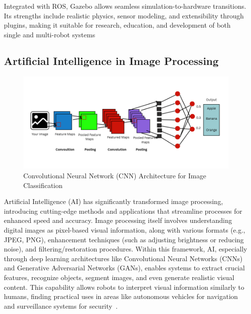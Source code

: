 \documentclass[12pt]{extarticle}
\begin{document}
Integrated with ROS, Gazebo allows seamless simulation-to-hardware transitions. Its strengths include realistic physics, sensor modeling, and extensibility through plugins, making it suitable for research, education, and development of both single and multi-robot systems~\cite{gazebo}


\subsection{Artificial Intelligence in Image Processing}

\begin{figure}[htbp]
    \centering
    \includegraphics[width=0.8\linewidth]{images/CNN.png}
    \caption{Convolutional Neural Network (CNN) Architecture for Image Classification}
    \label{fig:cnn}
\end{figure}

Artificial Intelligence (AI) has significantly transformed image processing, introducing cutting-edge methods and applications that streamline processes for enhanced speed and accuracy. Image processing itself involves understanding digital images as pixel-based visual information, along with various formats (e.g., JPEG, PNG), enhancement techniques (such as adjusting brightness or reducing noise), and filtering/restoration procedures. Within this framework, AI, especially through deep learning architectures like Convolutional Neural Networks (CNNs) and Generative Adversarial Networks (GANs), enables systems to extract crucial features, recognize objects, segment images, and even generate realistic visual content. This capability allows robots to interpret visual information similarly to humans, finding practical uses in areas like autonomous vehicles for navigation and surveillance systems for security~\cite{ai-in-image-processing}.
\end{document}
